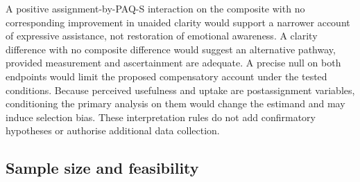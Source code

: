 \documentclass[11pt,a4paper]{article}
\begin{document}
A positive assignment-by-PAQ-S interaction on the composite with no corresponding improvement in unaided clarity would support a narrower account of expressive assistance, not restoration of emotional awareness. A clarity difference with no composite difference would suggest an alternative pathway, provided measurement and ascertainment are adequate. A precise null on both endpoints would limit the proposed compensatory account under the tested conditions. Because perceived usefulness and uptake are postassignment variables, conditioning the primary analysis on them would change the estimand and may induce selection bias. These interpretation rules do not add confirmatory hypotheses or authorise additional data collection.

\subsection{Sample size and feasibility}
\end{document}
